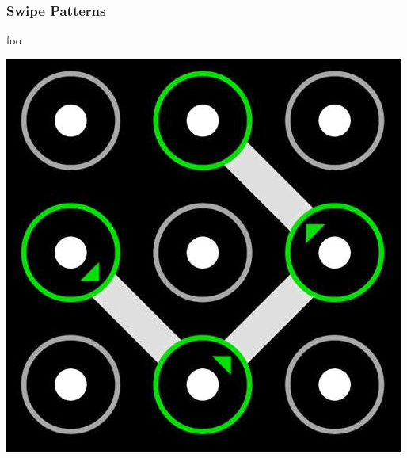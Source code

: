 \documentclass[aspectratio=169,dvipsnames]{beamer}
\begin{document}

\begin{frame}
\frametitle{Swipe Patterns}

\begin{minipage}{0.5\textwidth}
foo
\end{minipage}%
\begin{minipage}{0.5\textwidth}
\begin{center}
\includegraphics[scale=0.3]{images/swipe_unlock.jpg} 
\end{center}
\end{minipage}

\end{frame}
\end{document}
